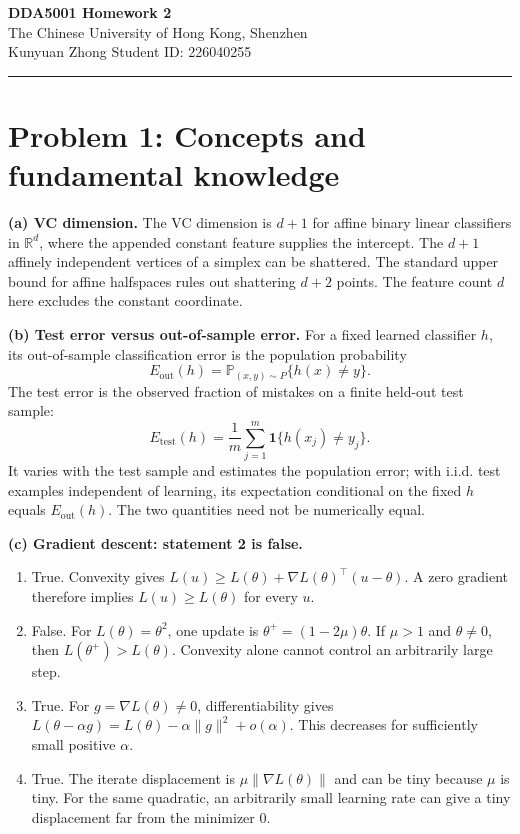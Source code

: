 \documentclass[11pt,a4paper]{article}
\newcommand{\R}{\mathbb R}
\newcommand{\Eout}{E_{\mathrm{out}}}
\begin{document}
\begin{center}{\Large\bfseries\color{CoursePurple}DDA5001 Homework 2}\\[4pt]
The Chinese University of Hong Kong, Shenzhen\\[2pt]
\small Kunyuan Zhong \quad Student ID: 226040255
\end{center}
\noindent\rule{\linewidth}{0.8pt}

\section*{Problem 1: Concepts and fundamental knowledge}
\textbf{(a) VC dimension.} The VC dimension is $d+1$ for affine binary linear classifiers in $\R^d$, where the appended constant feature supplies the intercept. The $d+1$ affinely independent vertices of a simplex can be shattered. The standard upper bound for affine halfspaces rules out shattering $d+2$ points. The feature count $d$ here excludes the constant coordinate.

\textbf{(b) Test error versus out-of-sample error.} For a fixed learned classifier $h$, its out-of-sample classification error is the population probability
\[
\Eout(h)=\mathbb P_{(x,y)\sim P}\{h(x)\ne y\}.
\]
The test error is the observed fraction of mistakes on a finite held-out test sample:
\[E_{\mathrm{test}}(h)=\frac1m\sum_{j=1}^m\mathbf 1\{h(x_j)\ne y_j\}.\]
It varies with the test sample and estimates the population error; with i.i.d. test examples independent of learning, its expectation conditional on the fixed $h$ equals $\Eout(h)$. The two quantities need not be numerically equal.

\textbf{(c) Gradient descent: statement 2 is false.}
\begin{enumerate}[label=\arabic*)]
\item True. Convexity gives $L(u)\ge L(\theta)+\nabla L(\theta)^\top(u-\theta)$. A zero gradient therefore implies $L(u)\ge L(\theta)$ for every $u$.
\item False. For $L(\theta)=\theta^2$, one update is $\theta^+=(1-2\mu)\theta$. If $\mu>1$ and $\theta\ne0$, then $L(\theta^+)>L(\theta)$. Convexity alone cannot control an arbitrarily large step.
\item True. For $g=\nabla L(\theta)\ne0$, differentiability gives $L(\theta-\alpha g)=L(\theta)-\alpha\|g\|^2+o(\alpha)$. This decreases for sufficiently small positive $\alpha$.
\item True. The iterate displacement is $\mu\|\nabla L(\theta)\|$ and can be tiny because $\mu$ is tiny. For the same quadratic, an arbitrarily small learning rate can give a tiny displacement far from the minimizer $0$.
\end{enumerate}
\end{document}
